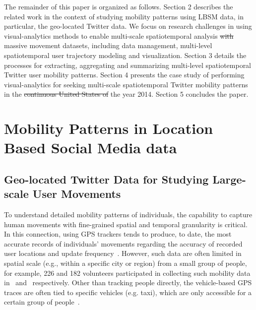 \documentclass[ijgi,article,accept,moreauthors,pdftex,10pt,a4paper]{mdpi}
\theoremstyle{mdpi}
\newcounter{ex}
\newcounter{re}
\theoremstyle{mdpidefinition}
\providecommand{\DIFadd}[1]{{\protect\color{blue}\uwave{#1}}} %
\providecommand{\DIFdel}[1]{{\protect\color{red}\sout{#1}}}                      %
\providecommand{\DIFaddbegin}{} %
\providecommand{\DIFaddend}{} %
\providecommand{\DIFdelbegin}{} %
\providecommand{\DIFdelend}{} %
\begin{document}
The remainder of this paper is organized as follows.
Section 2 describes the related work in the context of studying mobility patterns using LBSM data, in particular, the geo-located Twitter data.
We focus on research challenges in using visual-analytics methods to enable multi-scale spatiotemporal analysis \DIFdelbegin \DIFdel{with }\DIFdelend \DIFaddbegin \DIFadd{of }\DIFaddend massive movement datasets, including data management, multi-level spatiotemporal user trajectory modeling and visualization.
Section 3 details the processes for extracting, aggregating and summarizing multi-level spatiotemporal Twitter user mobility patterns.
Section 4 presents the case study of performing visual-analytics for seeking multi-scale spatiotemporal Twitter mobility patterns in the \DIFdelbegin \DIFdel{continuous United States of }\DIFdelend \DIFaddbegin \DIFadd{conterminous United States for }\DIFaddend the year 2014.
Section 5 concludes the paper.

\section{Mobility Patterns in Location Based Social Media data}
\subsection{Geo-located Twitter Data for Studying Large-scale User Movements}
To understand detailed mobility patterns of individuals, the capability to capture human movements with fine-grained spatial and temporal granularity is critical.
In this connection, using GPS trackers tends to produce, to date, the most accurate records of individuals' movements regarding the accuracy of recorded user locations and update frequency~\cite{zheng2008understanding}.
However, such data are often limited in spatial scale (e.g., within a specific city or region) from a small group of people, for example, 226 and 182 volunteers participated in collecting such mobility data in~\cite{rhee2011levy} and~\cite{zheng2010geolife} respectively.
Other than tracking people directly, the vehicle-based GPS traces are often tied to specific vehicles (e.g. taxi), which are only accessible for a certain group of people~\cite{kung2014exploring}. 
\end{document}
